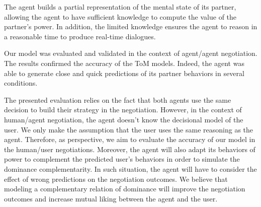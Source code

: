 \documentclass[sigconf]{aamas}  %
\begin{document}
		The agent builds a partial representation of the mental state of its partner, allowing the agent to have sufficient knowledge to compute the value of the partner's power. In addition, the limited knowledge ensures the agent to reason in a reasonable time to produce real-time dialogues.		 		
		
		Our model was evaluated and validated in the context of agent/agent negotiation. The results confirmed the accuracy of the ToM models. Indeed, the agent was able to generate close and quick predictions of its partner behaviors in several conditions.
		
		The presented evaluation relies on the fact that both agents use the same decision to build their strategy in  the negotiation. However, in the context of human/agent negotiation, the agent doesn't know the decisional model of the user. We only make the assumption that the user uses the same reasoning as the agent.
		 Therefore, as perspective, we aim to evaluate the accuracy of our model in the human/user negotiations. Moreover, the agent will also adapt its behaviors of power to complement the predicted user's behaviors in order to simulate the dominance complementarity. In such situation, the agent will have to consider the effect of wrong predictions on the negotiation outcomes. We believe that modeling a complementary relation of dominance will improve the negotiation outcomes and increase mutual liking between the agent and the user.
		
		
	
	
\end{document}
